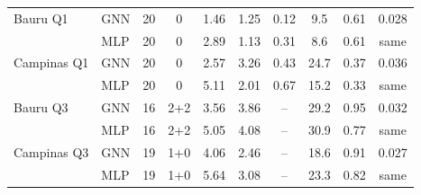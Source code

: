 \begin{table}[H]
\begin{tabular}{llcccccccc}
\midrule
Bauru Q1 & GNN & 20 & 0 & 1.46 & 1.25 & 0.12 & 9.5 & 0.61 & 0.028 \\
 & MLP & 20 & 0 & 2.89 & 1.13 & 0.31 & 8.6 & 0.61 & same \\
\midrule
Campinas Q1 & GNN & 20 & 0 & 2.57 & 3.26 & 0.43 & 24.7 & 0.37 & 0.036 \\
 & MLP & 20 & 0 & 5.11 & 2.01 & 0.67 & 15.2 & 0.33 & same \\
\midrule
Bauru Q3 & GNN & 16 & 2+2 & 3.56 & 3.86 & -- & 29.2 & 0.95 & 0.032 \\
 & MLP & 16 & 2+2 & 5.05 & 4.08 & -- & 30.9 & 0.77 & same \\
\midrule
Campinas Q3 & GNN & 19 & 1+0 & 4.06 & 2.46 & -- & 18.6 & 0.91 & 0.027 \\
 & MLP & 19 & 1+0 & 5.64 & 3.08 & -- & 23.3 & 0.82 & same \\
\bottomrule
\end{tabular}
\end{table}
